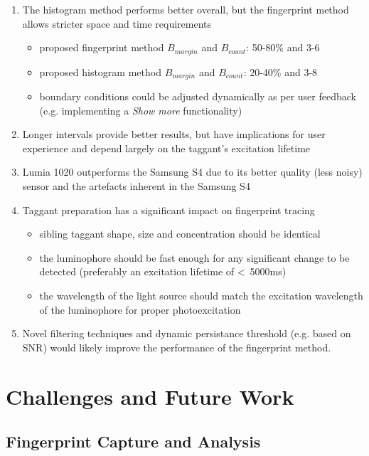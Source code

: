 \documentclass[thesis.tex]{subfiles}
\begin{document}
\begin{enumerate}
  \item The histogram method performs better overall, but the fingerprint method allows stricter space and time requirements
    \begin{itemize}
      \item proposed fingerprint method $B_{margin}$ and $B_{count}$: 50-80\% and 3-6
      \item proposed histogram method $B_{margin}$ and $B_{count}$: 20-40\% and 3-8
      \item boundary conditions could be adjusted dynamically as per user feedback (e.g. implementing a \emph{Show more} functionality)
    \end{itemize}
  \item Longer intervals provide better results, but have implications for user experience and depend largely on the taggant's excitation lifetime
  \item Lumia 1020 outperforms the Samsung S4 due to its better quality (less noisy) sensor and the artefacts inherent in the Samsung S4
  \item Taggant preparation has a significant impact on fingerprint tracing
    \begin{itemize}
      \item sibling taggant shape, size and concentration should be identical
      \item the luminophore should be fast enough for any significant change to be detected (preferably an excitation lifetime of \textless\ 5000ms)
      \item the wavelength of the light source should match the excitation wavelength of the luminophore for proper photoexcitation
    \end{itemize}
  \item Novel filtering techniques and dynamic persistance threshold (e.g. based on SNR) would likely improve the performance of the fingerprint method.
\end{enumerate}

\clearpage

\section{Challenges and Future Work}

\subsection{Fingerprint Capture and Analysis}
\end{document}
